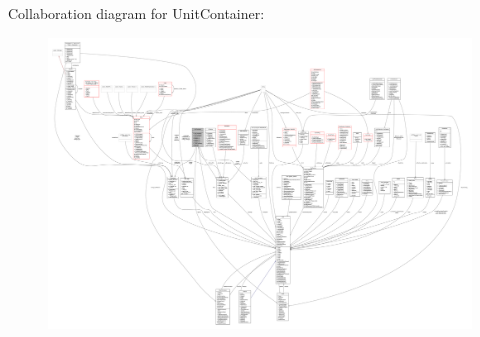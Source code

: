 Collaboration diagram for Unit\+Container\+:
\nopagebreak
\begin{figure}[H]
\begin{center}
\leavevmode
\includegraphics[width=350pt]{d1/d18/classUnitContainer__coll__graph}
\end{center}
\end{figure}
